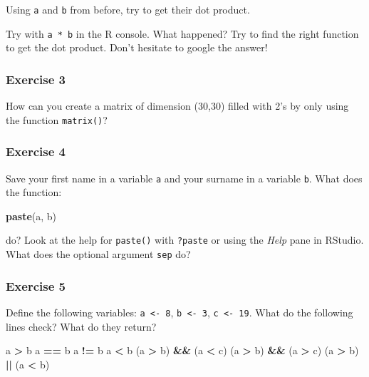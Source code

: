 \documentclass[]{gitbook}
\newenvironment{Shaded}{\begin{snugshade}}{\end{snugshade}}
\newcommand{\KeywordTok}[1]{\textcolor[rgb]{0.13,0.29,0.53}{\textbf{#1}}}
\newcommand{\NormalTok}[1]{#1}
\newcommand{\OperatorTok}[1]{\textcolor[rgb]{0.81,0.36,0.00}{\textbf{#1}}}
\newcommand{\StringTok}[1]{\textcolor[rgb]{0.31,0.60,0.02}{#1}}
\theoremstyle{definition}
\theoremstyle{definition}
\theoremstyle{definition}
\theoremstyle{remark}
\begin{document}
Using \texttt{a} and \texttt{b} from before, try to get their dot
product.

Try with \texttt{a\ *\ b} in the R console. What happened? Try to find
the right function to get the dot product. Don't hesitate to google the
answer!

\hypertarget{exercise-3}{%
\subsubsection*{Exercise 3}\label{exercise-3}}

How can you create a matrix of dimension (30,30) filled with 2's by only
using the function \texttt{matrix()}?

\hypertarget{exercise-4}{%
\subsubsection*{Exercise 4}\label{exercise-4}}

Save your first name in a variable \texttt{a} and your surname in a
variable \texttt{b}. What does the function:

\begin{Shaded}
\begin{Highlighting}[]
\KeywordTok{paste}\NormalTok{(a, b)}
\end{Highlighting}
\end{Shaded}

do? Look at the help for \texttt{paste()} with \texttt{?paste} or using
the \emph{Help} pane in RStudio. What does the optional argument
\texttt{sep} do?

\hypertarget{exercise-5}{%
\subsubsection*{Exercise 5}\label{exercise-5}}

Define the following variables: \texttt{a\ \textless{}-\ 8},
\texttt{b\ \textless{}-\ 3}, \texttt{c\ \textless{}-\ 19}. What do the
following lines check? What do they return?

\begin{Shaded}
\begin{Highlighting}[]
\NormalTok{a }\OperatorTok{>}\StringTok{ }\NormalTok{b}
\NormalTok{a }\OperatorTok{==}\StringTok{ }\NormalTok{b}
\NormalTok{a }\OperatorTok{!=}\StringTok{ }\NormalTok{b}
\NormalTok{a }\OperatorTok{<}\StringTok{ }\NormalTok{b}
\NormalTok{(a }\OperatorTok{>}\StringTok{ }\NormalTok{b) }\OperatorTok{&&}\StringTok{ }\NormalTok{(a }\OperatorTok{<}\StringTok{ }\NormalTok{c)}
\NormalTok{(a }\OperatorTok{>}\StringTok{ }\NormalTok{b) }\OperatorTok{&&}\StringTok{ }\NormalTok{(a }\OperatorTok{>}\StringTok{ }\NormalTok{c)}
\NormalTok{(a }\OperatorTok{>}\StringTok{ }\NormalTok{b) }\OperatorTok{||}\StringTok{ }\NormalTok{(a }\OperatorTok{<}\StringTok{ }\NormalTok{b)}
\end{Highlighting}
\end{Shaded}
\end{document}
